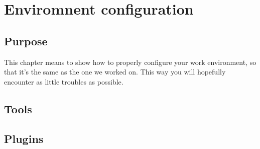 \section{Enviromnent configuration}
\subsection{Purpose}
This chapter means to show how to properly configure your work environment, so that it's the same as the one we worked on.\newline
This way you will hopefully encounter as little troubles as possible.

\subsection{Tools}
\subsection{Plugins}

